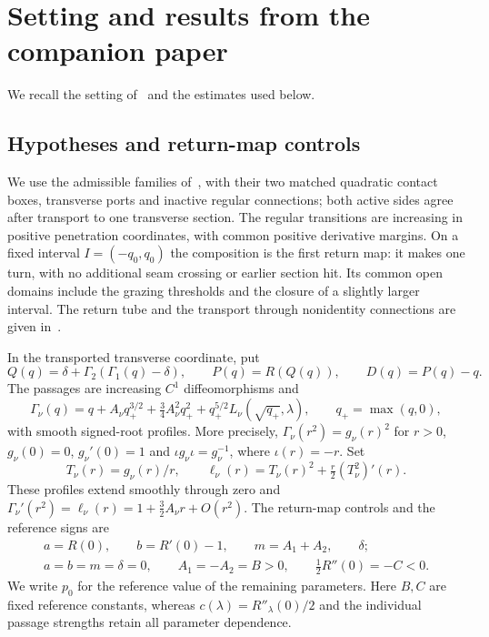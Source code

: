 \section{Setting and results from the companion paper}\label{sup:setting}

We recall the setting of~\cite{main2026} and the estimates used below.

\subsection{Hypotheses and return-map controls}

We use the admissible families
of~\cite[Definition~\ref*{main-def:admissible-family}]{main2026}, with their
two matched quadratic contact boxes, transverse ports and inactive regular
connections; both active sides agree after transport to one transverse section.
The regular transitions are increasing in positive penetration coordinates,
with common positive derivative margins.
On a fixed interval $I=(-q_0,q_0)$ the composition is the first
return map: it makes one turn, with no additional seam crossing or earlier
section hit. Its common open domains include the grazing thresholds and the
closure of a slightly larger interval. The return tube and the transport
through nonidentity connections are given
in~\cite[Lemma~\ref*{main-lem:common-tube} and
Proposition~\ref*{main-prop:field-recognition}]{main2026}.

In the transported transverse coordinate, put
\begin{equation}\label{sup:return}
 Q(q)=\delta+\Gamma_2(\Gamma_1(q)-\delta),\qquad
 P(q)=R(Q(q)),\qquad D(q)=P(q)-q.
\end{equation}
The passages are increasing $C^1$ diffeomorphisms and
\begin{equation}\label{sup:passage}
 \Gamma_\nu(q)=q+A_\nu q_+^{3/2}
       +\tfrac34A_\nu^2q_+^2
       +q_+^{5/2}L_\nu(\sqrt{q_+},\lambda),\qquad q_+=\max(q,0),
\end{equation}
with smooth signed-root profiles. More precisely,
$\Gamma_\nu(r^2)=g_\nu(r)^2$ for $r>0$,
$g_\nu(0)=0$, $g_\nu'(0)=1$ and
$\iota g_\nu\iota=g_\nu^{-1}$, where $\iota(r)=-r$.
Set
\[
 T_\nu(r)=g_\nu(r)/r,\qquad
 \ell_\nu(r)=T_\nu(r)^2+\tfrac r2(T_\nu^2)'(r).
\]
These profiles extend smoothly through zero and
$\Gamma_\nu'(r^2)=\ell_\nu(r)=1+\tfrac32A_\nu r+O(r^2)$.
The return-map controls and the reference signs are
\begin{equation}\label{sup:observations}
 \begin{gathered}
 a=R(0),\qquad b=R'(0)-1,\qquad m=A_1+A_2,\qquad\delta;\\
 a=b=m=\delta=0,\qquad A_1=-A_2=B>0,\qquad
 \tfrac12R''(0)=-C<0.
 \end{gathered}
\end{equation}
We write $p_0$ for the reference value of the remaining parameters.
Here $B,C$ are fixed reference constants, whereas $c(\lambda)=R''_\lambda(0)/2$
and the individual passage strengths retain all parameter dependence.

